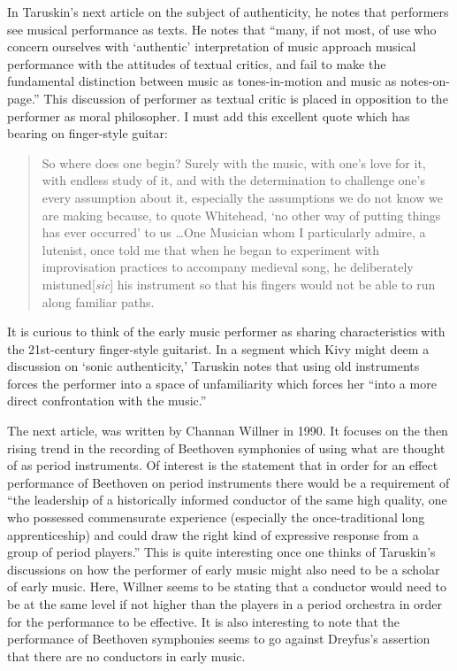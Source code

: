 \documentclass[12pt]{article}
\begin{document}
In Taruskin's next article on the subject of authenticity, he notes
that performers see musical performance as texts. He notes that
``many, if not most, of use who concern ourselves with `authentic'
interpretation of music approach musical performance with the
attitudes of textual critics, and fail to make the fundamental
distinction between music as tones-in-motion and music as
notes-on-page.''\autocite[4]{taruskin1984} This discussion of
performer as textual critic is placed in opposition to the performer
as moral philosopher. I must add this excellent quote which has bearing on finger-style guitar:
\begin{quote}
  So where does one begin? Surely with the music, with one's love for
  it, with endless study of it, and with the determination to
  challenge one's every assumption about it, especially the
  assumptions we do not know we are making because, to quote
  Whitehead, `no other way of putting things has ever occurred' to us
  \ldots One Musician whom I particularly admire, a lutenist, once
  told me that when he began to experiment with improvisation
  practices to accompany medieval song, he deliberately
  mistuned[\emph{sic}] his instrument so that his fingers would not be
  able to run along familiar paths.\autocite[10]{taruskin1984}
\end{quote}
It is curious to think of the early music performer as sharing
characteristics with the 21st-century finger-style guitarist. In a
segment which Kivy might deem a discussion on `sonic authenticity,'
Taruskin notes that using old instruments forces the performer into a
space of unfamiliarity which forces her ``into a more direct confrontation with the music.''\autocite[11]{taruskin1984}

The next article, was written by Channan Willner in 1990. It focuses
on the then rising trend in the recording of Beethoven symphonies of
using what are thought of as period instruments. Of interest is the
statement that in order for an effect performance of Beethoven on
period instruments there would be a requirement of ``the leadership of
a historically informed conductor of the same high quality, one who
possessed commensurate experience (especially the once-traditional
long apprenticeship) and could draw the right kind of expressive
response from a group of period players.''\autocite[89]{willner1990}
This is quite interesting once one thinks of Taruskin's discussions on
how the performer of early music might also need to be a scholar of
early music. Here, Willner seems to be stating that a conductor would
need to be at the same level if not higher than the players in a
period orchestra in order for the performance to be effective. It is
also interesting to note that the performance of Beethoven symphonies
seems to go against Dreyfus's assertion that there are no conductors
in early music.
\end{document}
